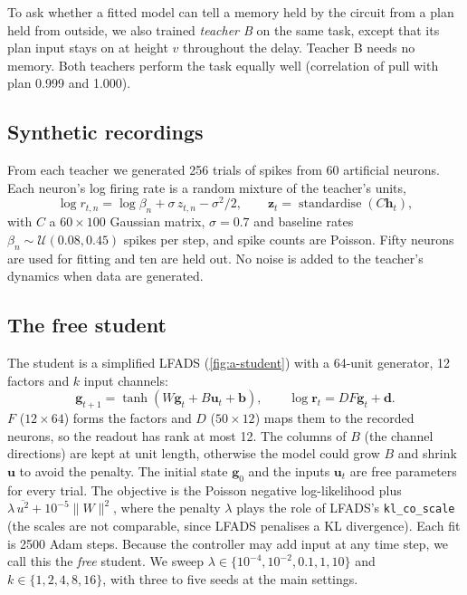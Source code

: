 \documentclass[11pt,a4paper]{article}
\newcommand{\vect}[1]{\bm{#1}}
\newcommand{\kl}{\texttt{kl\_co\_scale}}
\begin{document}
To ask whether a fitted model can tell a memory held by the circuit from a plan held from outside, we also trained \emph{teacher B} on the same task, except that its plan input stays on at height $v$ throughout the delay. Teacher B needs no memory. Both teachers perform the task equally well (correlation of pull with plan 0.999 and 1.000).

\subsection{Synthetic recordings}\label{sec:data}

From each teacher we generated 256 trials of spikes from 60 artificial neurons. Each neuron's log firing rate is a random mixture of the teacher's units,
\begin{equation}
  \log r_{t,n} = \log \beta_n + \sigma\, z_{t,n} - \sigma^2/2, \qquad \vect z_t = \operatorname{standardise}(C \vect h_t),
\end{equation}
with $C$ a $60\times100$ Gaussian matrix, $\sigma=0.7$ and baseline rates $\beta_n \sim \mathcal U(0.08,0.45)$ spikes per step, and spike counts are Poisson. Fifty neurons are used for fitting and ten are held out. No noise is added to the teacher's dynamics when data are generated.

\subsection{The free student}\label{sec:student}

The student is a simplified LFADS (\cref{fig:a-student}) with a 64-unit generator, 12 factors and $k$ input channels:
\begin{equation}
  \vect g_{t+1} = \tanh\!\left(W \vect g_t + B \vect u_t + \vect b\right), \qquad \log \vect r_t = D F \vect g_t + \vect d .
  \label{eq:student}
\end{equation}
$F$ ($12\times64$) forms the factors and $D$ ($50\times12$) maps them to the recorded neurons, so the readout has rank at most 12. The columns of $B$ (the channel directions) are kept at unit length, otherwise the model could grow $B$ and shrink $\vect u$ to avoid the penalty. The initial state $\vect g_0$ and the inputs $\vect u_t$ are free parameters for every trial. The objective is the Poisson negative log-likelihood plus $\lambda\,\overline{u^2} + 10^{-5}\lVert W\rVert^2$, where the penalty $\lambda$ plays the role of LFADS's \kl{} (the scales are not comparable, since LFADS penalises a KL divergence). Each fit is 2500 Adam steps. Because the controller may add input at any time step, we call this the \emph{free} student. We sweep $\lambda \in \{10^{-4},10^{-2},0.1,1,10\}$ and $k\in\{1,2,4,8,16\}$, with three to five seeds at the main settings.
\end{document}

